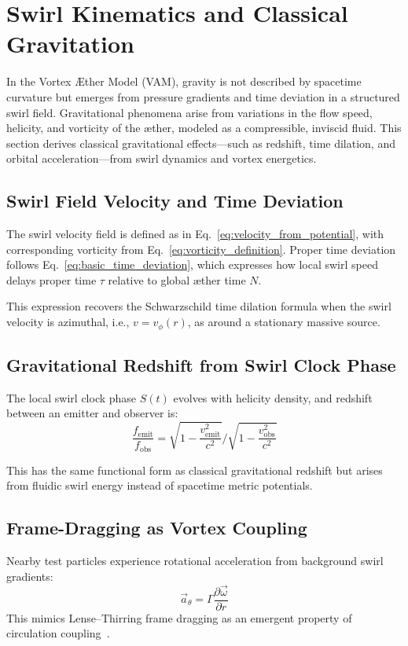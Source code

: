 \documentclass[preprint]{revtex4-2}
\begin{document}
\section{Swirl Kinematics and Classical Gravitation}\label{sec:swirl-kinematics-and-classical-gravitation}
    In the Vortex \AE ther Model (VAM), gravity is not described by spacetime curvature but emerges from pressure gradients and time deviation in a structured swirl field. Gravitational phenomena arise from variations in the flow speed, helicity, and vorticity of the æther, modeled as a compressible, inviscid fluid. This section derives classical gravitational effects—such as redshift, time dilation, and orbital acceleration—from swirl dynamics and vortex energetics.

    \subsection{Swirl Field Velocity and Time Deviation}
    The swirl velocity field is defined as in Eq.~\ref{eq:velocity_from_potential}, with corresponding vorticity from Eq.~\ref{eq:vorticity_definition}. Proper time deviation follows Eq.~\ref{eq:basic_time_deviation}, which expresses how local swirl speed delays proper time $\tau$ relative to global æther time $N$.

    This expression recovers the Schwarzschild time dilation formula when the swirl velocity is azimuthal, i.e., $v = v_\phi(r)$, as around a stationary massive source.

    \subsection{Gravitational Redshift from Swirl Clock Phase}
    The local swirl clock phase $S(t)$ evolves with helicity density, and redshift between an emitter and observer is:
    \begin{equation}
        \frac{f_{\text{emit}}}{f_{\text{obs}}} = \sqrt{1 - \frac{v_{\text{emit}}^2}{c^2}} \bigg/ \sqrt{1 - \frac{v_{\text{obs}}^2}{c^2}}
        \label{eq:gravitational_redshift}
    \end{equation}

    This has the same functional form as classical gravitational redshift but arises from fluidic swirl energy instead of spacetime metric potentials.

    \subsection{Frame-Dragging as Vortex Coupling}
    Nearby test particles experience rotational acceleration from background swirl gradients:
    \begin{equation}
        \vec{a}_\theta = \Gamma \frac{\partial \vec{\omega}}{\partial r}
        \label{eq:frame_drag_accel}
    \end{equation}
    This mimics Lense–Thirring frame dragging as an emergent property of circulation coupling~\cite{thorne1986blackholes}.
\end{document}
